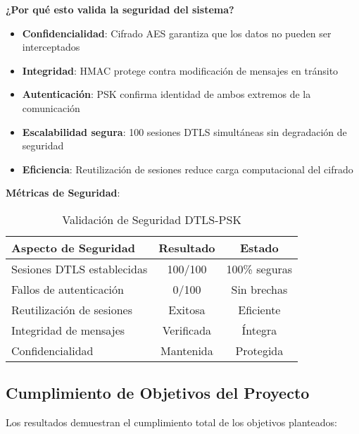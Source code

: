 \textbf{¿Por qué esto valida la seguridad del sistema?}
\begin{itemize}
    \item \textbf{Confidencialidad}: Cifrado AES garantiza que los datos no pueden ser interceptados
    \item \textbf{Integridad}: HMAC protege contra modificación de mensajes en tránsito
    \item \textbf{Autenticación}: PSK confirma identidad de ambos extremos de la comunicación
    \item \textbf{Escalabilidad segura}: 100 sesiones DTLS simultáneas sin degradación de seguridad
    \item \textbf{Eficiencia}: Reutilización de sesiones reduce carga computacional del cifrado
\end{itemize}

\textbf{Métricas de Seguridad}:
\begin{table}[h]
\centering
\begin{tabular}{|l|c|c|}
\hline
\textbf{Aspecto de Seguridad} & \textbf{Resultado} & \textbf{Estado} \\
\hline
Sesiones DTLS establecidas & 100/100 & \textcolor{successgreen}{100\% seguras} \\
Fallos de autenticación & 0/100 & \textcolor{successgreen}{Sin brechas} \\
Reutilización de sesiones & Exitosa & \textcolor{successgreen}{Eficiente} \\
Integridad de mensajes & Verificada & \textcolor{successgreen}{Íntegra} \\
Confidencialidad & Mantenida & \textcolor{successgreen}{Protegida} \\
\hline
\end{tabular}
\caption{Validación de Seguridad DTLS-PSK}
\label{tab:seguridad-dtls}
\end{table}

\subsection{Cumplimiento de Objetivos del Proyecto}\label{subsec:cumplimiento-objetivos}

Los resultados demuestran el cumplimiento total de los objetivos planteados:

